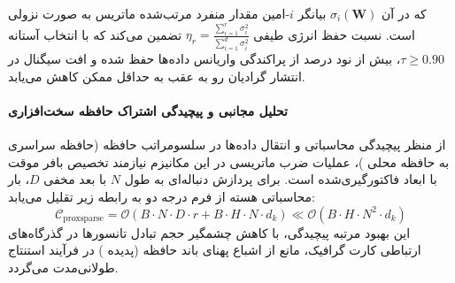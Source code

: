 که در آن $\sigma_i(\mathbf{W})$ بیانگر $i$-امین مقدار منفرد مرتب‌شده ماتریس به صورت نزولی است. نسبت حفظ انرژی طیفی $\eta_r = \frac{\sum_{i=1}^r \sigma_i^2}{\sum_{i=1}^{d} \sigma_i^2}$ تضمین می‌کند که با انتخاب آستانه $\tau \ge 0.90$، بیش از نود درصد از پراکندگی واریانس داده‌ها حفظ شده و افت سیگنال در انتشار گرادیان رو به عقب به حداقل ممکن کاهش می‌یابد.

\paragraph{تحلیل مجانبی و پیچیدگی اشتراک حافظه سخت‌افزاری}
از منظر پیچیدگی محاسباتی و انتقال داده‌ها در سلسومراتب حافظه (حافظه سراسری  به حافظه محلی )، عملیات ضرب ماتریسی در این مکانیزم نیازمند تخصیص بافر موقت با ابعاد فاکتورگیری‌شده است. برای پردازش دنباله‌ای به طول $N$ با بعد مخفی $D$، بار محاسباتی هسته از فرم درجه دو به رابطه زیر تقلیل می‌یابد:
\begin{equation}
\label{eq:complexity_proxsparse}
\mathcal{C}_{\text{proxsparse}} = \mathcal{O}\left( B \cdot N \cdot D \cdot r + B \cdot H \cdot N \cdot d_k \right) \ll \mathcal{O}\left( B \cdot H \cdot N^2 \cdot d_k \right)
\end{equation}
این بهبود مرتبه پیچیدگی، با کاهش چشمگیر حجم تبادل تانسورها در گذرگاه‌های ارتباطی کارت گرافیک، مانع از اشباع پهنای باند حافظه (پدیده ) در فرآیند استنتاج طولانی‌مدت می‌گردد.
